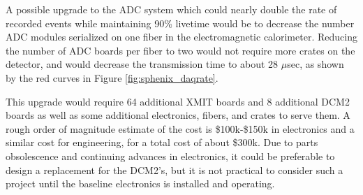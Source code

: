 A possible upgrade to the ADC system which could nearly double
the rate of recorded events while maintaining 90\% livetime would be to decrease the number ADC modules serialized on one fiber in the electromagnetic calorimeter.
Reducing the number of ADC boards per fiber to two would not require more crates on the detector, and would decrease the transmission time to about 28 $\mu$sec, as 
shown by the red curves in Figure \ref{fig:sphenix_daqrate}.

This upgrade would require 64 additional XMIT boards and 8 additional DCM2 boards
as well as some additional electronics, fibers, and crates to serve them.  
A rough order of magnitude estimate of the cost is \$100k-\$150k in 
electronics and a similar cost for engineering, for a total cost of about
\$300k.
Due to parts obsolescence and continuing advances in electronics, it could be
preferable to design a replacement for the DCM2's, but it is not practical to 
consider such a project until the baseline electronics is installed and operating.




